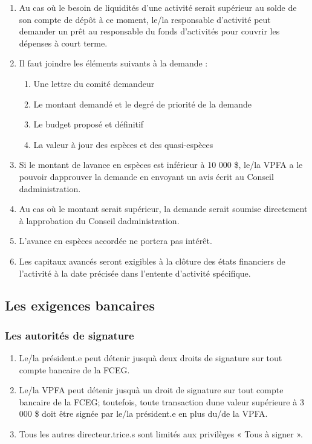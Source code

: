 \begin{enumerate}
 \item
  Au cas où le besoin de liquidités d'une activité serait supérieur au solde de son compte de dépôt à ce moment, le/la responsable d'activité peut demander un prêt au responsable du fonds d'activités pour couvrir les dépenses à court terme.
 \item
  Il faut joindre les éléments suivants à la demande :

  \begin{enumerate}
   \item
    Une lettre du comité demandeur
   \item
    Le montant demandé et le degré de priorité de la demande
   \item
    Le budget proposé et définitif
   \item
    La valeur à jour des espèces et des quasi-espèces
  \end{enumerate}
 \item
  Si le montant de l\textquotesingle avance en espèces est inférieur à 10 000 \$, le/la VPFA a le pouvoir d\textquotesingle approuver la demande en envoyant un avis écrit au Conseil d\textquotesingle administration.
 \item
  Au cas où le montant serait supérieur, la demande serait soumise directement à l\textquotesingle approbation du Conseil d\textquotesingle administration.
 \item
  L'avance en espèces accordée ne portera pas intérêt.
 \item
  Les capitaux avancés seront exigibles à la clôture des états financiers de l'activité à la date précisée dans l'entente d'activité spécifique.
\end{enumerate}

\subsection{Les exigences bancaires}
\label{les-exigences-bancaires}

\subsubsection{Les autorités de signature}
\label{les-autorites-de-signature}

\begin{enumerate}
 \item
  Le/la président.e peut détenir jusqu\textquotesingle à deux droits de signature sur tout compte bancaire de la FCEG.
 \item
  Le/la VPFA peut détenir jusqu\textquotesingle à un droit de signature sur tout compte bancaire de la FCEG; toutefois, toute transaction d\textquotesingle une valeur supérieure à 3 000 \$ doit être signée par le/la président.e en plus du/de la VPFA.
 \item
  Tous les autres directeur.trice.s sont limités aux privilèges « Tous à signer ».
\end{enumerate}

